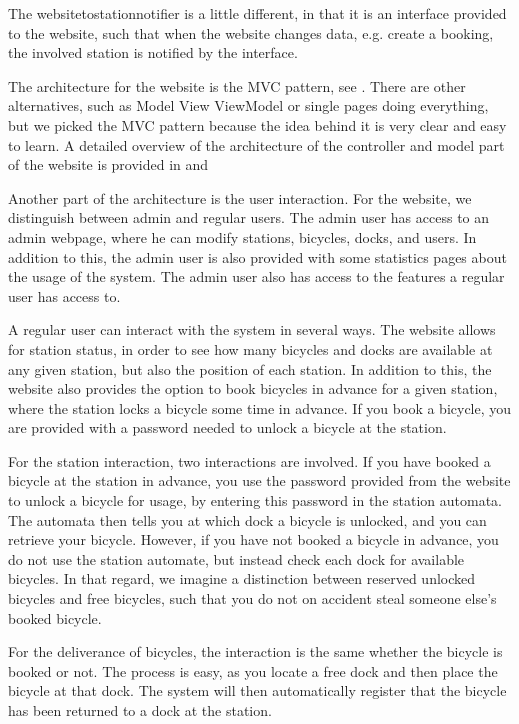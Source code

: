 The websitetostationnotifier is a little different, in that it is an interface provided to the website, such that when the website changes data, e.g. create a booking, the involved station is notified by the interface.

The architecture for the website is the MVC pattern, see . There are other alternatives, such as Model View ViewModel or single pages doing everything, but we picked the MVC pattern because the idea behind it is very clear and easy to learn.
A detailed overview of the architecture of the controller and model part of the website is provided in  and 

Another part of the architecture is the user interaction.
For the website, we distinguish between admin and regular users.
The admin user has access to an admin webpage, where he can modify stations, bicycles, docks, and users.
In addition to this, the admin user is also provided with some statistics pages about the usage of the system.
The admin user also has access to the features a regular user has access to.

A regular user can interact with the system in several ways.
The website allows for station status, in order to see how many bicycles and docks are available at any given station, but also the position of each station.
In addition to this, the website also provides the option to book bicycles in advance for a given station, where the station locks a bicycle some time in advance.
If you book a bicycle, you are provided with a password needed to unlock a bicycle at the station.

For the station interaction, two interactions are involved.
If you have booked a bicycle at the station in advance, you use the password provided from the website to unlock a bicycle for usage, by entering this password in the station automata.
The automata then tells you at which dock a bicycle is unlocked, and you can retrieve your bicycle.
However, if you have not booked a bicycle in advance, you do not use the station automate, but instead check each dock for available bicycles.
In that regard, we imagine a distinction between reserved unlocked bicycles and free bicycles, such that you do not on accident steal someone else's booked bicycle.

For the deliverance of bicycles, the interaction is the same whether the bicycle is booked or not.
The process is easy, as you locate a free dock and then place the bicycle at that dock.
The system will then automatically register that the bicycle has been returned to a dock at the station.


